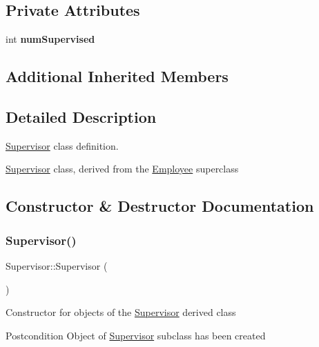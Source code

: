 \subsection*{Private Attributes}
\begin{DoxyCompactItemize}
\item 
\mbox{\label{classSupervisor_af8b7097d8147c93a68d1f63c5b898797}} 
int {\bfseries num\+Supervised}
\end{DoxyCompactItemize}
\subsection*{Additional Inherited Members}


\subsection{Detailed Description}
\hyperlink{classSupervisor}{Supervisor} class definition. 

\hyperlink{classSupervisor}{Supervisor} class, derived from the \hyperlink{classEmployee}{Employee} superclass 

\subsection{Constructor \& Destructor Documentation}
\mbox{\label{classSupervisor_a9d7eafc36b5429092ba0f758bc7841c4}} 
\subsubsection{\texorpdfstring{Supervisor()}{Supervisor()}\hspace{0.1cm}{\footnotesize\ttfamily [1/2]}}
{\footnotesize\ttfamily Supervisor\+::\+Supervisor (\begin{DoxyParamCaption}{ }\end{DoxyParamCaption})}

Constructor for objects of the \hyperlink{classSupervisor}{Supervisor} derived class

\begin{DoxyPostcond}{Postcondition}
Object of \hyperlink{classSupervisor}{Supervisor} subclass has been created 
\end{DoxyPostcond}
\mbox{\label{classSupervisor_a02d9245744652deb20e9408001d6ed3b}} 
